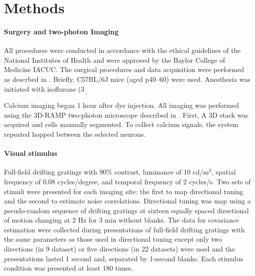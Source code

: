 \documentclass[10pt]{article}
\begin{document}
\section*{Methods}
\paragraph{Surgery and two-photon Imaging}
All procedures were conducted in accordance with the ethical guidelines of the National Institutes of Health and were approved by the Baylor College of Medicine IACUC.  The surgical procedures and data acquisition were performed as descrbed in \cite{Cotton:2013}. Briefly, C57BL/6J mice (aged p40--60) were used. Anesthesia was initiated with isoflurane (3%

Calcium imaging began 1 hour after dye injection.  All imaging was performed using the 3D-RAMP two-photon microscope described in \cite{Cotton:2013}. First, A 3D stack was acquired and cells manually segmented.  To collect calcium signals, the system repeated hopped between the selected neurons. 
\paragraph{Visual stimulus}
Full-field drifting gratings with 90\% contrast, luminance of 10 cd/m$^2$, spatial frequency of 0.08 cycles/degree, and temporal frequency of 2 cycles/s. Two sets of stimuli were presented for each imaging site: the first to map directional tuning and the second to estimate noise correlations. Directional tuning was map using a pseudo-random sequence of drifting gratings at sixteen equally spaced directional of motion changing at 2 Hz for 3 min without blanks. The data for covariance estimation were collected during presentations of full-field drifting gratings with the same parameters as those used in directional tuning except only two directions (in 9 dataset) or five directions (in 22 datasets) were used and the presentations lasted 1 second and, separated by 1-second blanks.  Each stimulus condition was presented at least 180 times. 
\end{document}
